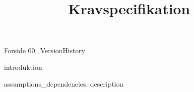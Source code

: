 \documentclass[a4paper,openany]{memoir}
\title{Kravspecifikation}
\begin{document}
	{Forside}  \newpage
	\tableofcontents\thispagestyle{fancy}
	{00_VersionHistory}  \newpage

	{introduktion}

	{assumptions_dependencies.}
	{description}  \newpage

	 {}
	\printbibliography
\end{document}
